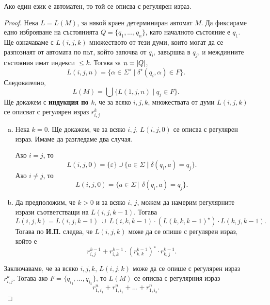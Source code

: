 \begin{lemma}
  Ако един език е автоматен, то той се описва с регулярен израз.
\end{lemma}
\begin{proof}
  Нека  $L = L(M)$, за някой краен детерминиран автомат $M$.
  Да фиксираме едно изброяване на състоянията $Q = \{q_1,\dots,q_n\}$,
  като началното състояние е $q_1$.
  Ще означаваме с $L(i,j,k)$ множеството от тези думи, които
  могат да се разпознаят от автомата по път, който започва от $q_i$,
  завършва в $q_j$, и междинните състояния имат индекси $\leq k$.
  Тогава за $n = \vert{Q}\vert$, 
  \[L(i,j,n) = \{\alpha\in\Sigma^\star\mid \delta^\star(q_i,\alpha) \in F\}.\]
  Следователно,
  \[L(M) = \bigcup\{L(1,j,n)\mid q_j \in F\}.\]
  Ще докажем с {\bf индукция по $k$}, че за всяко $i,j,k$, множествата от думи $L(i,j,k)$
  се описват с регулярен израз $r^k_{i,j}$
  \begin{enumerate}[a)]
  \item
    Нека $k = 0$. Ще докажем, че за всяко $i,j$, $L(i,j,0)$ се описва с регулярен израз.
    Имаме да разгледаме два случая.
    
    Ако $i = j$, то 
    \[L(i, j, 0) = \{\varepsilon\}\cup\{a\in\Sigma \mid \delta(q_i,a) = q_j\}.\]
    Ако $i \neq j$, то
    \[L(i, j, 0) = \{a\in\Sigma \mid \delta(q_i, a) = q_j\}.\]
  \item
    Да предположим, че $k > 0$ и за всяко $i$, $j$, можем да намерим регулярните изрази
    съответстващи на $L(i,j,k-1)$. Тогава
    \[L(i,j,k) = L(i,j,k-1)\ \cup\ L(i,k,k-1)\cdot (L(k,k,k-1)^\star) \cdot L(k,j,k-1).\]
    Тогава по {\bf И.П.} следва, че $L(i,j,k)$ може да се опише с регулярен израз, който е
    \[r^{k-1}_{i,j} + r^{k-1}_{i,k}\cdot (r^{k-1}_{k,k})^\star\cdot r^{k-1}_{k,j}.\]
  \end{enumerate}
  Заключаваме, че за всяко $i,j,k$, $L(i,j,k)$ може да се опише с регулярен израз $r^{k}_{i,j}$.
  Тогава ако $F = \{q_{i_1},\dots,q_{i_k}\}$, то $L(M)$ се описва с регулярния израз
  \[r^n_{1,i_1} + r^n_{1,i_2} + \dots + r^n_{1,i_k}.\]
\end{proof}

